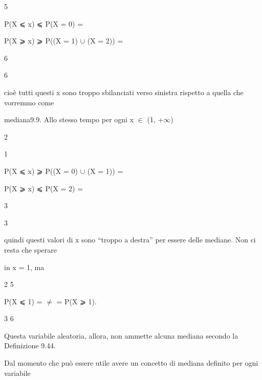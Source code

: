 \documentclass[a4paper,portrait,12pt]{article}
\begin{document}
5


\begin{flushleft}
P(X ⩽ x) ⩽ P(X = 0) =
\end{flushleft}


\begin{flushleft}
P(X ⩾ x) ⩾ P((X = 1) $\cup$ (X = 2)) =
\end{flushleft}


6


6


\begin{flushleft}
cio\`{e} tutti questi x sono troppo sbilanciati verso sinistra rispetto a quella che vorremmo come
\end{flushleft}


\begin{flushleft}
mediana9.9. Allo stesso tempo per ogni x $\in$ (1, +$\infty$)
\end{flushleft}


2


1


\begin{flushleft}
P(X ⩽ x) ⩾ P((X = 0) $\cup$ (X = 1)) =
\end{flushleft}


\begin{flushleft}
P(X ⩾ x) ⩽ P(X = 2) =
\end{flushleft}


3


3


\begin{flushleft}
quindi questi valori di x sono {``}troppo a destra'' per essere delle mediane. Non ci resta che sperare
\end{flushleft}


\begin{flushleft}
in x = 1, ma
\end{flushleft}


2 5


\begin{flushleft}
P(X ⩽ 1) = $\neq$ = P(X ⩾ 1).
\end{flushleft}


3 6


\begin{flushleft}
Questa variabile aleatoria, allora, non ammette alcuna mediana secondo la Definizione 9.44.
\end{flushleft}


\begin{flushleft}
Dal momento che pu\`{o} essere utile avere un concetto di mediana definito per ogni variabile
\end{flushleft}
\end{document}
